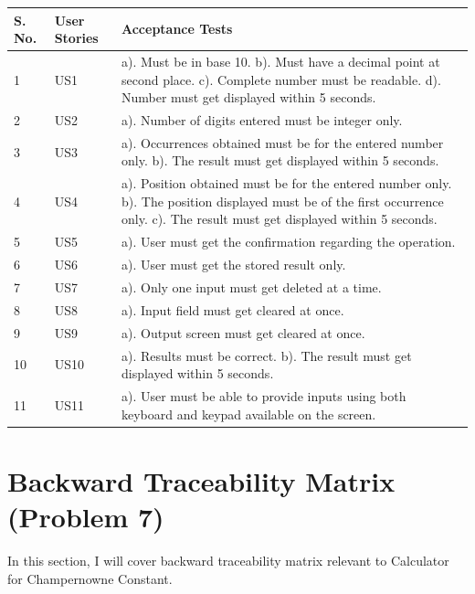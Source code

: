 \documentclass[paper=a4, fontsize=11pt]{report}
\numberwithin{equation}{section}		%
\numberwithin{figure}{section}			%
\numberwithin{table}{section}				%
\begin{document}
\begin{center}
\begin{tabular}{| m{1.3cm} |  m{1.2cm} | m{35em} |} 
\hline
S. No. & User Stories & Acceptance Tests \\ [0.7ex]
\hline\hline
1 & US1 & a). Must be in base 10.\newline
b). Must have a decimal point at second place.\newline
c). Complete number must be readable.\newline
d). Number must get displayed within 5 seconds. \\ 
\hline
2 & US2 & a). Number of digits entered must be integer only. \\ 
\hline
3 & US3 & a). Occurrences obtained must be for the entered number only.\newline
b). The result must get displayed within 5 seconds. \\ 
\hline
4 & US4 & a). Position obtained must be for the entered number only.\newline
b). The position displayed must be of the first occurrence only.\newline
c). The result must get displayed within 5 seconds.  \\ 
\hline
5 & US5 & a). User must get the confirmation regarding the operation. \\ 
\hline
6 & US6 & a). User must get the stored result only. \\ 
\hline
7 & US7 & a). Only one input must get deleted at a time. \\ 
\hline
8 & US8 & a). Input field must get cleared at once. \\ 
\hline
9 & US9 & a). Output screen must get cleared at once. \\ 
\hline
10 & US10 & a). Results must be correct.\newline
b). The result must get displayed within 5 seconds.  \\ 
\hline
11 & US11 & a). User must be able to provide inputs using both keyboard and keypad available on the screen.   \\ 
\hline
\end{tabular}
\end{center}



\chapter{Backward Traceability Matrix (Problem 7)}
In this section, I will cover backward traceability matrix relevant to Calculator for Champernowne Constant. \newline
\end{document}
